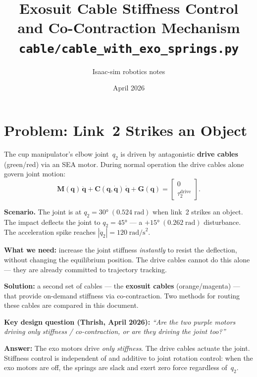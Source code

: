 \documentclass[11pt, a4paper]{article}
\title{\textbf{Exosuit Cable Stiffness Control \\and Co-Contraction Mechanism}\\
       \large \texttt{cable/cable\_with\_exo\_springs.py}}
\date{April 2026}
\author{Isaac-sim robotics notes}
\newcommand{\bq}{\bm{q}}
\newcommand{\bM}{\bm{M}}
\newcommand{\bC}{\bm{C}}
\newcommand{\bG}{\bm{G}}
\begin{document}
\maketitle

\section{Problem: Link~2 Strikes an Object}
\label{sec:problem}

The cup manipulator's elbow joint~$q_2$ is driven by antagonistic
\textbf{drive cables} (green/red) via an SEA motor.  During normal
operation the drive cables alone govern joint motion:
%
\begin{equation}\label{eq:eom-drive}
    \bM(\bq)\,\ddot{\bq} + \bC(\bq,\dot{\bq})\,\dot{\bq} + \bG(\bq)
    = \begin{bmatrix} 0 \\ \tau_2^{\text{drive}} \end{bmatrix}.
\end{equation}

\noindent
\textbf{Scenario.}\;
The joint is at $q_2 = 30°\;(0.524\;\text{rad})$ when link~2 strikes an
object.  The impact deflects the joint to $q_2 = 45°$ --- a
$+15°\;(0.262\;\text{rad})$ disturbance.  The acceleration spike reaches
$|\ddot{q}_2| = 120\;\text{rad/s}^2$.

\medskip\noindent
\textbf{What we need:} increase the joint stiffness \emph{instantly} to
resist the deflection, without changing the equilibrium position.  The drive
cables cannot do this alone --- they are already committed to trajectory
tracking.

\medskip\noindent
\textbf{Solution:} a second set of cables --- the \textbf{exosuit cables}
(orange/magenta) --- that provide on-demand stiffness via co-contraction.
Two methods for routing these cables are compared in this document.

\begin{mdframed}
\textbf{Key design question (Thrish, April 2026):}
\emph{``Are the two purple motors driving only stiffness / co-contraction,
or are they driving the joint too?''}

\medskip\noindent
\textbf{Answer:} The exo motors drive \emph{only stiffness}.  The drive
cables actuate the joint.  Stiffness control is independent of and additive
to joint rotation control: when the exo motors are off, the springs are slack
and exert zero force regardless of~$q_2$.
\end{mdframed}
\end{document}
